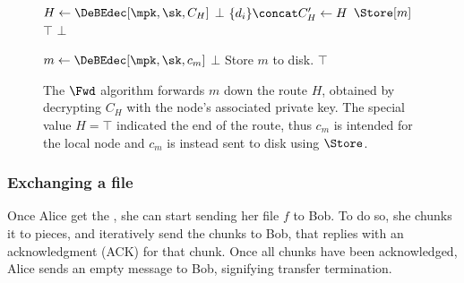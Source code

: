 \begin{figure}[t]
  \begin{algorithmic}[1]
      \State $H\gets \DeBEdec[\mpk, \sk, C_H]$
        \State \Return $\bot$
      \EndIf
      \State $\{d_i\}\concat C_H'\gets H$
        \State \Return $\Store[m]$
      \EndIf
          \State \Return $\top$
        \EndIf
      \EndFor
      \State \Return $\bot$
    \EndFunction
  \end{algorithmic}

  \begin{algorithmic}[1]
      \State $m\gets \DeBEdec[\mpk, \sk, c_m]$
        \State \Return $\bot$
      \EndIf
      \State Store $m$ to disk.
      \State \Return $\top$
    \EndFunction
  \end{algorithmic}
  \caption{\label{SPORFwd}%
    The \(\Fwd\) algorithm forwards \(m\) down the route \(H\), obtained 
    by decrypting \(C_H\) with the node's associated private key.
    The special value \(H = \top\) indicated the end of the route, thus \(c_m\) 
    is intended for the local node and \(c_m\) is instead sent to disk using 
    \(\Store\).%
  }
\end{figure}

\subsubsection{Exchanging a file} %
\label{ssub:exchanging_a_file}

\newcommand{\messagesize}{\ensuremath{s_m}}
\newcommand{\filesize}{\ensuremath{s_{fc}}}
\newcommand{\headersize}{\ensuremath{s_{\mathcal{H}}}}

Once Alice get the \Hforward, she can start sending her file $f$ to Bob. 
To do so, she chunks it to pieces, and iteratively send the chunks to Bob, that replies with an acknowledgment (ACK) for that chunk.
Once all chunks have been acknowledged, Alice sends an empty message to Bob, signifying transfer termination.
 



